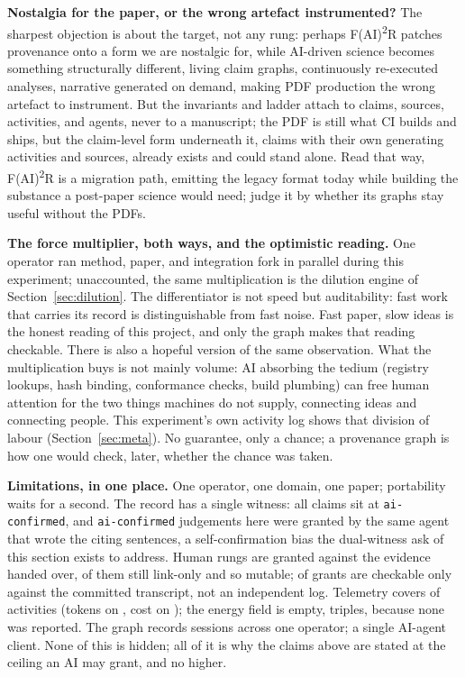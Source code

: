 \textbf{Nostalgia for the paper, or the wrong artefact instrumented?}
The sharpest objection is about the target, not any rung: perhaps
F(AI)\textsuperscript{2}R patches provenance onto a form we are
nostalgic for, while AI-driven science becomes something structurally
different, living claim graphs, continuously re-executed analyses,
narrative generated on demand, making PDF production the wrong
artefact to instrument. But the invariants and ladder attach to
claims, sources, activities, and agents, never to a manuscript; the
PDF is still what CI builds and ships, but the claim-level form
underneath it, \MClaims{} claims with their own generating activities
and sources, already exists and could stand alone. Read that way,
F(AI)\textsuperscript{2}R is a migration path, emitting the legacy
format today while building the substance a post-paper science would
need; judge it by whether its graphs stay useful without the PDFs.

\textbf{The force multiplier, both ways, and the optimistic reading.}
One operator ran method, paper, and integration fork in parallel
during this experiment; unaccounted, the same multiplication is the
dilution engine of Section~\ref{sec:dilution}. The differentiator is
not speed but auditability: fast work that carries its record is
distinguishable from fast noise. Fast paper, slow ideas is the honest
reading of this project, and only the graph makes that reading
checkable. There is also a hopeful version of the same observation.
What the multiplication buys is not mainly volume: AI absorbing the
tedium (registry lookups, hash binding, conformance checks, build
plumbing) can free human attention for the two things machines do not
supply, connecting ideas and connecting people. This experiment's own
activity log shows that division of labour (Section~\ref{sec:meta}).
No guarantee, only a chance; a provenance graph is how one would
check, later, whether the chance was taken.

\textbf{Limitations, in one place.} One operator, one domain, one
paper; portability waits for a second. The record has a single
witness: all \MClaims{} claims sit at \texttt{ai-confirmed}, and
\texttt{ai-confirmed} judgements here were granted by the same agent
that wrote the citing sentences, a self-confirmation bias the dual-witness
ask of this section exists to address. Human rungs are granted
against the evidence handed over, \MLinkOnly{} of them still
link-only and so mutable; \MGrantsSession{} of \MHumanRungs{} grants
are checkable only against the committed transcript, not an
independent log. Telemetry covers \MActsTelemetry{} of \MActivities{}
activities (tokens on \MActsTokens, cost on \MActsCost); the energy
field is empty, \MEnergyTriples{} triples, because none was reported.
The graph records \MSessionIds{} sessions across one operator; a
single AI-agent client. None of this is hidden; all of it is why the
claims above are stated at the ceiling an AI may grant, and no
higher.
